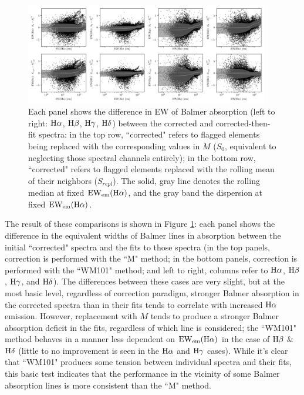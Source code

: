 \begin{figure}
    \centering
    \includegraphics[width=0.95\textwidth]{balmermasking_test}
    \caption[Effects of strong Balmer emission on fits to highest four Balmer absorption features]{\fixspacing Each panel shows the difference in EW of Balmer absorption (left to right: ${\rm H\alpha}$, ${\rm H\beta}$, ${\rm H\gamma}$, ${\rm H\delta}$) between the corrected and corrected-then-fit spectra: in the top row, ``corrected" refers to flagged elements being replaced with the corresponding values in $M$ ($S_0$, equivalent to neglecting those spectral channels entirely); in the bottom row, ``corrected" refers to flagged elements replaced with the rolling mean of their neighbors ($S_{repl}$). The solid, gray line denotes the rolling median at fixed ${\rm EW_{em}(H\alpha)}$, and the gray band the dispersion at fixed ${\rm EW_{em}(H\alpha)}$.}
    \label{fig:balmermasking_test}
\end{figure}

The result of these comparisons is shown in Figure \ref{fig:balmermasking_test}: each panel shows the difference in the equivalent widths of Balmer lines in absorption between the initial ``corrected" spectra and the fits to those spectra (in the top panels, correction is performed with the ``M" method; in the bottom panels, correction is performed with the ``WM101" method; and left to right, columns refer to ${\rm H\alpha}$, ${\rm H\beta}$, ${\rm H\gamma}$, and ${\rm H\delta}$). The differences between these cases are very slight, but at the most basic level, regardless of correction paradigm, stronger Balmer absorption in the corrected spectra than in their fits tends to correlate with increased ${\rm H\alpha}$ emission. However, replacement with $M$ tends to produce a stronger Balmer absorption deficit in the fits, regardless of which line is considered; the ``WM101" method behaves in a manner less dependent on ${\rm EW_{em}(H\alpha)}$ in the case of ${\rm H\beta}$ \& ${\rm H\delta}$ (little to no improvement is seen in the ${\rm H\alpha}$ and ${\rm H\gamma}$ cases). While it's clear that ``WM101" produces some tension between individual spectra and their fits, this basic test indicates that the performance in the vicinity of some Balmer absorption lines is more consistent than the ``M" method.

